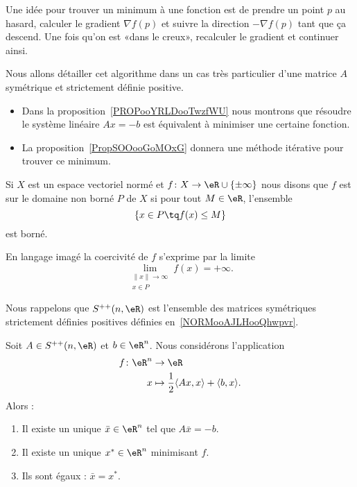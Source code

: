 Une idée pour trouver un minimum à une fonction est de prendre un point \( p\) au hasard, calculer le gradient \(\nabla f(p) \) et suivre la direction \(-\nabla f(p)\) tant que ça descend. Une fois qu'on est «dans le creux», recalculer le gradient et continuer ainsi.

Nous allons détailler cet algorithme dans un cas très particulier d'une matrice \( A\) symétrique et strictement définie positive.
\begin{itemize}
	\item Dans la proposition~\ref{PROPooYRLDooTwzfWU} nous montrons que résoudre le système linéaire \( Ax=-b\) est équivalent à minimiser une certaine fonction.
	\item La proposition~\ref{PropSOOooGoMOxG} donnera une méthode itérative pour trouver ce minimum.
\end{itemize}

\begin{definition}  \label{DefQXPooYSygGP}
	Si \( X\) est un espace vectoriel normé et \( f\colon X\to \eR\cup\{ \pm\infty \}\) nous disons que \( f\) est  sur le domaine non borné \( P\) de \( X\) si pour tout \( M\in \eR\), l'ensemble
	\begin{equation}
		\{ x\in P\tq f(x)\leq M \}
	\end{equation}
	est borné.
\end{definition}
En langage imagé la coercivité de \( f\) s'exprime par la limite
\begin{equation}
	\lim_{\substack{\| x \|\to \infty\\x\in P}}f(x)=+\infty.
\end{equation}


Nous rappelons que \( S^{++}(n,\eR)\) est l'ensemble des matrices symétriques strictement définies positives définies en~\ref{NORMooAJLHooQhwpvr}.
\begin{proposition}     \label{PROPooYRLDooTwzfWU}
	Soit \( A\in S^{++}(n,\eR)\) et \( b\in \eR^n\). Nous considérons l'application
	\begin{equation}
		\begin{aligned}
			f\colon \eR^n & \to \eR                                                          \\
			x             & \mapsto \frac{ 1 }{2}\langle Ax, x\rangle +\langle b, x\rangle .
		\end{aligned}
	\end{equation}
	Alors :
	\begin{enumerate}
		\item
		      Il existe un unique \( \bar x\in \eR^n\) tel que \( A\bar x=-b\).
		\item
		      Il existe un unique \( x^*\in \eR^n\) minimisant \( f\).
		\item
		      Ils sont égaux : \( \bar x=x^*\).
	\end{enumerate}
\end{proposition}

